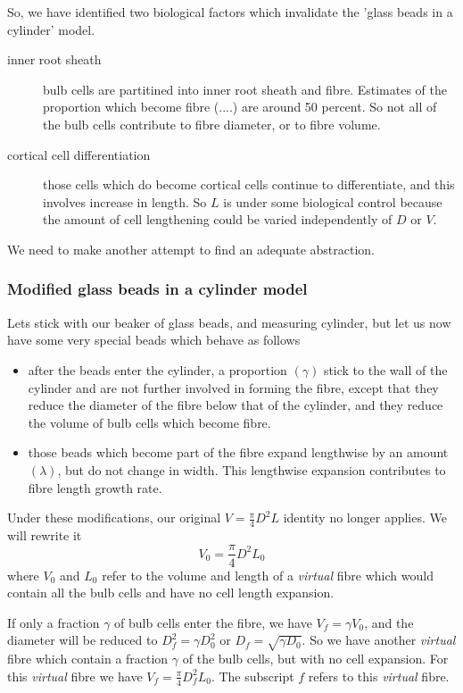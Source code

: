 \documentclass[titlepage]{article}  %
\begin{document}
So, we have identified two biological factors which invalidate the 'glass beads in a cylinder' model. 
\begin{description}
\item[inner root sheath] bulb cells are partitined into inner root sheath and fibre. Estimates of the proportion which become fibre (....) are around 50 percent. So not all of the bulb cells contribute to fibre diameter, or to fibre volume.\item[cortical cell differentiation] those cells which do become cortical cells continue to differentiate, and this involves increase in length. So $L$ is under some biological control because the amount of cell lengthening could be varied independently of $D$ or $V$. 
\end{description}

We need to make another attempt to find an adequate abstraction.

\subsubsection{Modified glass beads in a cylinder model}
Lets stick with our beaker of glass beads, and measuring cylinder, but let us now have some very special beads which behave as follows
\begin{itemize}
\item after the beads enter the cylinder, a proportion $(\gamma)$ stick to the wall of the cylinder and are not further involved in forming the fibre, except that they reduce the diameter of the fibre below that of the cylinder, and they reduce the volume of bulb cells which become fibre.
\item those beads which become part of the fibre expand lengthwise by an amount $(\lambda)$, but do not change in width. This lengthwise expansion contributes to fibre length growth rate.
\end{itemize}

Under these modifications, our original $V = \frac{\pi}{4} D^{2} L$ identity no longer applies. We will rewrite it
\begin{displaymath}
V_{0} = \frac{\pi}{4} D^{2} L_{0}
\end{displaymath}
where $V_{0}$ and $L_{0}$ refer to the volume and length of a {\em virtual} fibre which would contain all the bulb cells and have no cell length expansion.

If only a fraction $\gamma$ of bulb cells enter the fibre, we have $V_{f} = \gamma V_{0}$, and the diameter will be reduced to $D_{f}^{2} =  \gamma D_{0}^{2} $ or $D_{f} =  \sqrt{\gamma D_{0}} $. So we have another {\em virtual} fibre which contain a fraction $\gamma$ of the bulb cells, but with no cell expansion. For this {\em virtual} fibre we have $V_{f} = \frac{\pi}{4} D^{2}_{f} L_{0}$. The subscript $f$ refers to this {\em virtual} fibre.
\end{document}

